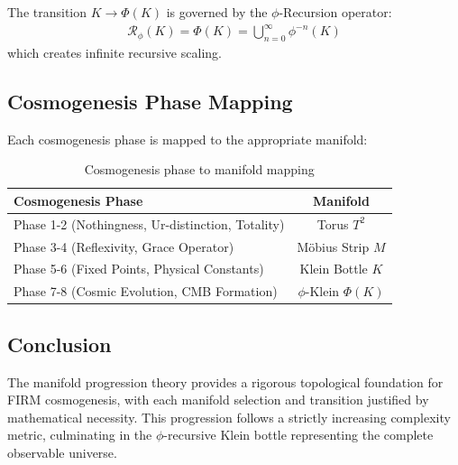 \begin{definition}
The transition $K \rightarrow \Phi(K)$ is governed by the $\phi$-Recursion operator:
\begin{align}
\mathcal{R}_{\phi}(K) = \Phi(K) = \bigcup_{n=0}^{\infty} \phi^{-n}(K)
\end{align}
which creates infinite recursive scaling.
\end{definition}

\subsection{Cosmogenesis Phase Mapping}

Each cosmogenesis phase is mapped to the appropriate manifold:

\begin{table}[H]
\centering
\begin{tabular}{|l|c|}
\hline
\textbf{Cosmogenesis Phase} & \textbf{Manifold} \\
\hline
Phase 1-2 (Nothingness, Ur-distinction, Totality) & Torus $T^2$ \\
\hline
Phase 3-4 (Reflexivity, Grace Operator) & Möbius Strip $M$ \\
\hline
Phase 5-6 (Fixed Points, Physical Constants) & Klein Bottle $K$ \\
\hline
Phase 7-8 (Cosmic Evolution, CMB Formation) & $\phi$-Klein $\Phi(K)$ \\
\hline
\end{tabular}
\caption{Cosmogenesis phase to manifold mapping}
\label{tab:phase_mapping}
\end{table}

\subsection{Conclusion}

The manifold progression theory provides a rigorous topological foundation for FIRM cosmogenesis, with each manifold selection and transition justified by mathematical necessity. This progression follows a strictly increasing complexity metric, culminating in the $\phi$-recursive Klein bottle representing the complete observable universe.

